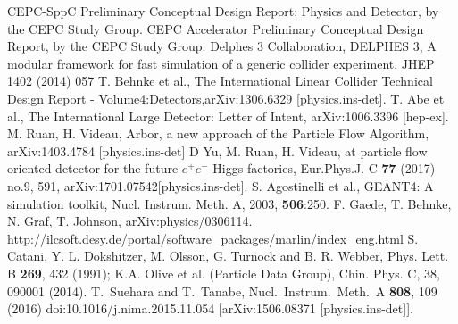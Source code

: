 \documentclass[a4paper,10pt,twoside]{cpc-hepnp}
\begin{document}
\begin{multicols}{2}
\begin{thebibliography}{90}
CEPC-SppC Preliminary Conceptual Design Report: Physics and Detector, by the CEPC Study Group.
CEPC Accelerator Preliminary Conceptual Design Report, by the CEPC Study Group.
 Delphes 3 Collaboration, DELPHES 3, A modular framework for fast simulation of a generic collider experiment, JHEP 1402 (2014) 057
T. Behnke et al., The International Linear Collider Technical Design Report - Volume4:Detectors,arXiv:1306.6329 [physics.ins-det].
T. Abe et al., The International Large Detector: Letter of Intent, arXiv:1006.3396 [hep-ex].
M. Ruan, H. Videau, Arbor, a new approach of the Particle Flow Algorithm, arXiv:1403.4784 [physics.ins-det]
D Yu, M. Ruan, H. Videau, at particle flow oriented detector for the future $e^+e^-$ Higgs factories, Eur.Phys.J. C {\bf 77} (2017) no.9, 591, arXiv:1701.07542[physics.ins-det].
S. Agostinelli et al., GEANT4: A simulation toolkit, Nucl. Instrum. Meth. A, 2003, {\bf 506}:250.
F. Gaede, T. Behnke, N. Graf, T. Johnson, arXiv:physics/0306114.
 http://ilcsoft.desy.de/portal/software\_packages/marlin/index\_eng.html
 S. Catani, Y. L. Dokshitzer, M. Olsson, G. Turnock and B. R. Webber, Phys. Lett. B {\bf 269}, 432 (1991);
 K.A. Olive et al. (Particle Data Group), Chin. Phys. C, 38, 090001 (2014).
 T.~Suehara and T.~Tanabe, Nucl.\ Instrum.\ Meth.\ A {\bf 808}, 109 (2016) doi:10.1016/j.nima.2015.11.054 [arXiv:1506.08371 [physics.ins-det]].

\end{thebibliography}
\end{multicols}

\clearpage
\end{document}
